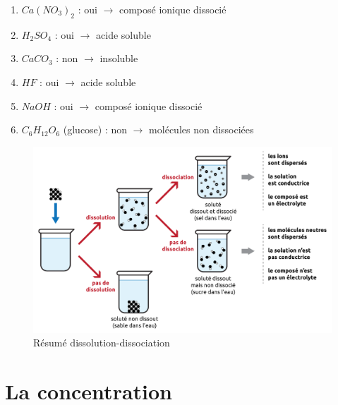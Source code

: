\documentclass[
  11pt,
  a4paper,
  openany]{book}
\begin{document}
\begin{Answer}

\begin{enumerate}
\def\labelenumi{\arabic{enumi}.}
\item
  \(Ca(NO_3)_2\) : oui \(\rightarrow\) composé ionique dissocié
\item
  \(H_2SO_4\) : oui \(\rightarrow\) acide soluble
\item
  \(CaCO_3\) : non \(\rightarrow\) insoluble
\item
  \(HF\) : oui \(\rightarrow\) acide soluble
\item
  \(NaOH\) : oui \(\rightarrow\) composé ionique dissocié
\item
  \(C_6H_{12}O_6\) (glucose) : non \(\rightarrow\) molécules non dissociées
\end{enumerate}

\end{Answer}


\begin{figure}

{\centering \includegraphics[width=1\linewidth]{images/dissociation-resume} 

}

\caption{Résumé dissolution-dissociation}\label{fig:dissociation-resume}
\end{figure}

\newpage

\hypertarget{la-concentration}{%
\section{La concentration}\label{la-concentration}}
\end{document}
